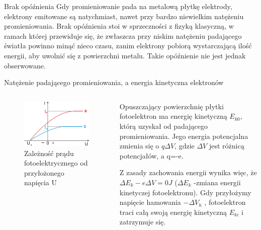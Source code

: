 \documentclass{cubeamer}
\begin{document}
	\begin{frame}{Brak opóźnienia}
		Gdy promieniowanie pada na metalową płytkę elektrody, elektrony emitowane są
		natychmiast, nawet przy bardzo niewielkim natężeniu promieniowania. Brak
		opóźnienia stoi w sprzeczności z fizyką klasyczną, w ramach której przewiduje
		się, że zwłaszcza przy niskim natężeniu padającego światła powinno minąć
		nieco czasu, zanim elektrony pobiorą wystarczającą ilość energii, aby
		uwolnić się z powierzchni metalu. Takie opóźnienie nie jest jednak obserwowane.
	\end{frame}

	\begin{frame}{Natężenie padającego promieniowania, a energia kinetyczna elektronów}
		\begin{columns}
			\begin{column}{0.5\textwidth}
				\begin{figure}
					\centering
					\includegraphics[height=0.5\textheight]{img/rysunek_1.2.png}
					\caption{Zależność prądu fotoelektrycznego od przyłożonego napięcia U}
				\end{figure}
			\end{column}
			\begin{column}{0.6\textwidth}
				Opuszczający powierzchnię płytki fotoelektron ma energię kinetyczną $E_{k0}$,
				którą uzyskał od padającego promieniowania. Jego energia potencjalna zmienia
				się o $q\Delta V$, gdzie $\Delta V$ jest różnicą potencjałów, a q=-e.

				Z zasady zachowania energii wynika więc, że $\Delta E_{k}-e\Delta V=0J$ ($\Delta
				E_{k}$
				-zmiana energii kinetyczej fotoelektronu). Gdy przyłożymy napięcie hamowania
				$-\Delta V_{h}$ , fotoelektron traci całą swoją energię kinetyczną $E_{ki}$
				i zatrzymuje się.
			\end{column}
		\end{columns}
	\end{frame}
\end{document}
